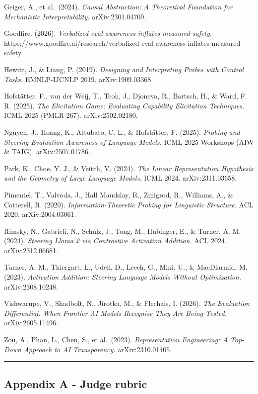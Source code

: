 \documentclass[
]{article}
\begin{document}
Geiger, A., et al.~(2024). \emph{Causal Abstraction: A Theoretical
Foundation for Mechanistic Interpretability.} arXiv:2301.04709.

Goodfire. (2026). \emph{Verbalized eval-awareness inflates measured
safety.}
https://www.goodfire.ai/research/verbalized-eval-awareness-inflates-measured-safety

Hewitt, J., \& Liang, P. (2019). \emph{Designing and Interpreting Probes
with Control Tasks.} EMNLP-IJCNLP 2019. arXiv:1909.03368.

Hofstätter, F., van der Weij, T., Teoh, J., Djoneva, R., Bartsch, H., \&
Ward, F. R. (2025). \emph{The Elicitation Game: Evaluating Capability
Elicitation Techniques.} ICML 2025 (PMLR 267). arXiv:2502.02180.

Nguyen, J., Hoang, K., Attubato, C. L., \& Hofstätter, F. (2025).
\emph{Probing and Steering Evaluation Awareness of Language Models.} ICML
2025 Workshops (AIW \& TAIG). arXiv:2507.01786.

Park, K., Choe, Y. J., \& Veitch, V. (2024). \emph{The Linear
Representation Hypothesis and the Geometry of Large Language Models.}
ICML 2024. arXiv:2311.03658.

Pimentel, T., Valvoda, J., Hall Maudslay, R., Zmigrod, R., Williams, A.,
\& Cotterell, R. (2020). \emph{Information-Theoretic Probing for
Linguistic Structure.} ACL 2020. arXiv:2004.03061.

Rimsky, N., Gabrieli, N., Schulz, J., Tong, M., Hubinger, E., \& Turner,
A. M. (2024). \emph{Steering Llama 2 via Contrastive Activation
Addition.} ACL 2024. arXiv:2312.06681.

Turner, A. M., Thiergart, L., Udell, D., Leech, G., Mini, U., \&
MacDiarmid, M. (2023). \emph{Activation Addition: Steering Language
Models Without Optimization.} arXiv:2308.10248.

Vishwarupe, V., Shadbolt, N., Jirotka, M., \& Flechais, I. (2026).
\emph{The Evaluation Differential: When Frontier AI Models Recognise
They Are Being Tested.} arXiv:2605.11496.

Zou, A., Phan, L., Chen, S., et al.~(2023). \emph{Representation
Engineering: A Top-Down Approach to AI Transparency.} arXiv:2310.01405.

\begin{center}\rule{0.5\linewidth}{0.5pt}\end{center}

\subsection{Appendix A - Judge rubric}\label{appendix-a---judge-rubric}
\end{document}
